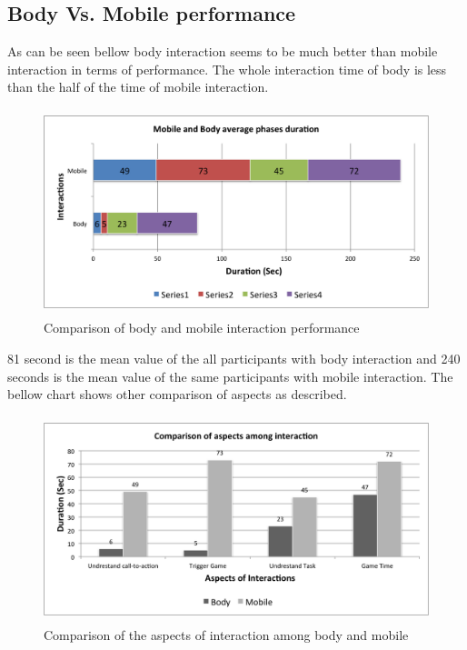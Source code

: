 


\subsection{Body Vs. Mobile performance}
As can be seen bellow body interaction seems to be much better than mobile interaction in terms of performance. The whole interaction time of body is less than the half of the time of mobile interaction. 

\begin{figure}[H]
\centering
\includegraphics[width=12cm,height=6cm]{Figures/6/mobile_body_performance}%
 \caption{Comparison of body and mobile interaction performance }%
 \label{fig:mobile_body_performance}%
\end{figure}

81 second is the mean value of the all participants with body interaction and 240 seconds is the mean value of the same participants with mobile interaction. The bellow chart shows other comparison of aspects as described.

\begin{figure}[H]
\centering
\includegraphics[width=12cm,height=6cm]{Figures/6/mobile_body_aspect}%
 \caption{Comparison of the aspects of interaction among body and mobile }%
 \label{fig:mobile_body_aspect}%
\end{figure}


